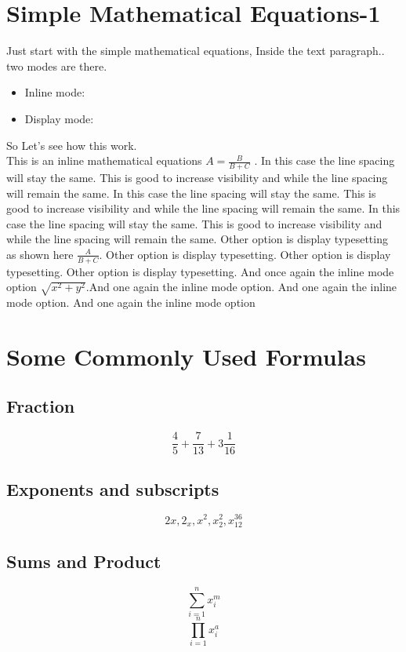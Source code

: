 \documentclass{article}
\begin{document}
	\section{Simple Mathematical Equations-1}
	Just start with the simple mathematical equations, Inside the text paragraph.. two modes are there. 
	\begin{itemize}
		\item Inline mode:  
		\item Display mode:
	\end{itemize}
   So Let's see how this work. \\
   This is an inline mathematical equations    $A=\frac{B}{B+C}$ . In this case the line spacing will stay the same. This is good to increase visibility and while the line spacing will remain the same. In this case the line spacing will stay the same. This is good to increase visibility and while the line spacing will remain the same. In this case the line spacing will stay the same. This is good to increase visibility and while the line spacing will remain the same. Other option is display typesetting as shown here   ${\displaystyle \frac{A}{B+C}}$. Other option is display typesetting. Other option is display typesetting. Other option is display typesetting. And once again the inline mode option  $\sqrt{x^{2}+y^{2}}$.And one again the inline mode option. And one again the inline mode option. And one again the inline mode option



   \section{Some Commonly Used Formulas}
	
	
	\subsection{Fraction}
	\[ \frac{4}{5}+\frac{7}{13} + 3\frac{1}{16}   \]
	
	
	\subsection{Exponents and subscripts}
	\[2x , 2_x , x^2 , x_2^2 , x_{12}^{36} \]
	
	\subsection{Sums and Product}
	\[  \sum_{i=1}^{n} x_{i}^m  \]  \quad \[ \prod_{i=1}^{n} x_{i}^a \]
	
\end{document}
